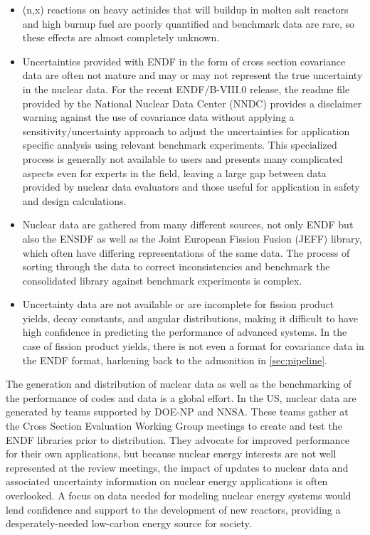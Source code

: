 \documentclass[letterpaper]{ar-1col}
\begin{document}
\begin{itemize}
  \item (n,x) reactions on heavy actinides that will buildup in molten salt reactors and high burnup fuel are poorly quantified and benchmark data are rare, so these effects are almost completely unknown.
  \item Uncertainties provided with ENDF in the form of cross section covariance data are often not mature and may or may not represent the true uncertainty in the nuclear data.
For the recent ENDF/B-VIII.0 release, the readme file provided by the National Nuclear Data Center (NNDC) provides a disclaimer warning against the use of covariance data without applying a sensitivity/uncertainty approach to adjust the uncertainties for application specific analysis using relevant benchmark experiments.
This specialized process is generally not available to users and presents many complicated aspects even for experts in the field, leaving a large gap between data provided by nuclear data evaluators and those useful for application in safety and design calculations.
  \item Nuclear data are gathered from many different sources, not only ENDF but also the ENSDF as well as the Joint European Fission Fusion (JEFF) library, which often have differing representations of the same data.
The process of sorting through the data to correct inconsistencies and benchmark the consolidated library against benchmark experiments is complex.
  \item Uncertainty data are not available or are incomplete for fission product yields, decay constants, and angular distributions, making it difficult to have high confidence in predicting the performance of advanced systems.  In the case of fission product yields, there is not even a format for covariance data in the ENDF format, harkening back to the admonition in  \autoref{sec:pipeline}.
\end{itemize}


The generation and distribution of nuclear data as well as the benchmarking of the performance of codes and data is a global effort.
In the US, nuclear data are generated by teams supported by DOE-NP and NNSA.
These teams gather at the Cross Section Evaluation Working Group meetings to create and test the ENDF libraries prior to distribution.
They advocate for improved performance for their own applications, but because nuclear energy interests are not well represented at the review meetings, the impact of updates to nuclear data and associated uncertainty information on nuclear energy applications is often overlooked.  A focus on data needed for modeling nuclear energy systems would lend confidence and support to the development of new reactors, providing a desperately-needed low-carbon energy source for society.  
\end{document}
